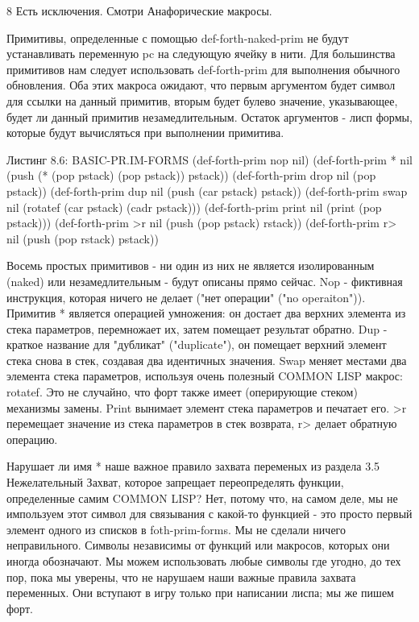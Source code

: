 8 Есть исключения. Смотри Анафорические макросы.

Примитивы, определенные с помощью def-forth-naked-prim не будут устанавливать переменную pc на следующую ячейку в нити. Для большинства примитивов нам следует использовать def-forth-prim для выполнения обычного обновления. Оба этих макроса ожидают, что первым аргументом будет символ для ссылки на данный примитив, вторым будет булево значение, указывающее, будет ли данный примитив незамедлительным. Остаток аргументов - лисп формы, которые будут вычисляться при выполнении примитива.

Листинг 8.6: BASIC-PR.IM-FORMS
(def-forth-prim nop nil)
(def-forth-prim * nil
(push (* (pop pstack) (pop pstack))
pstack))
(def-forth-prim drop nil
(pop pstack))
(def-forth-prim dup nil
(push (car pstack) pstack))
(def-forth-prim swap nil
(rotatef (car pstack) (cadr pstack)))
(def-forth-prim print nil
(print (pop pstack)))
(def-forth-prim >r nil
(push (pop pstack) rstack))
(def-forth-prim r> nil
(push (pop rstack) pstack)) 

Восемь простых примитивов - ни один из них не является изолированным (naked) или незамедлительным - будут описаны прямо сейчас. Nop - фиктивная инструкция, которая ничего не делает ("нет операции" ("no operaiton")). Примитив * является операцией умножения: он достает два верхних элемента из стека параметров, перемножает их, затем помещает результат обратно. Dup - краткое название для "дубликат" ("duplicate"), он помещает верхний элемент стека снова в стек, создавая два идентичных значения. Swap меняет местами два элемента стека параметров, используя очень полезный COMMON LISP макрос: rotatef. Это не случайно, что форт также имеет (оперирующие стеком) механизмы замены. Print вынимает элемент стека параметров и печатает его. >r перемещает значение из стека параметров в стек возврата, r> делает обратную операцию.

Нарушает ли имя * наше важное правило захвата переменых из раздела 3.5 Нежелательный Захват, которое запрещает переопределять функции, определенные самим COMMON LISP? Нет, потому что, на самом деле, мы не импользуем этот символ для связывания с какой-то функцией - это просто первый элемент одного из списков в foth-prim-forms. Мы не сделали ничего неправильного. Символы независимы от функций или макросов, которых они иногда обозначают. Мы можем использовать любые символы где угодно, до тех пор, пока мы уверены, что не нарушаем наши важные правила захвата переменных. Они вступают в игру только при написании лиспа; мы же пишем форт.

